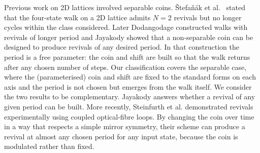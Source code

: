 Previous work on 2D lattices involved separable coins.   \v{S}tefa\v{n}\'ak et al.\
\cite{Stefanak2010} stated that the four-state walk
on a 2D lattice admits $N = 2$ revivals but no
longer cycles within the class considered.
Later Dodangodage \cite{Dodangodage2018} constructed walks with
revivals of longer period and Jayakody \cite{Jayakody2018} showed that a non-separable coin can
be designed to produce revivals of any desired period.  In that construction the period is a free
parameter: the coin and shift are built so that the walk returns after any chosen number of steps.
Our classification covers the separable case, where the (parameterised) coin and shift are fixed 
to the standard forms on each axis and the period is not chosen but emerges from the walk itself.
We consider the two results to be complementary. Jayakody answers whether a revival of any given period
can be built.  More recently, Steinfurth et al. \cite{Steinfurth2026} demonstrated revivals experimentally using coupled optical-fibre loops.  By changing the coin over time in a way that respects a simple mirror symmetry, their scheme can produce a revival at almost any chosen period for any input state, because the coin is modulated rather than fixed.
